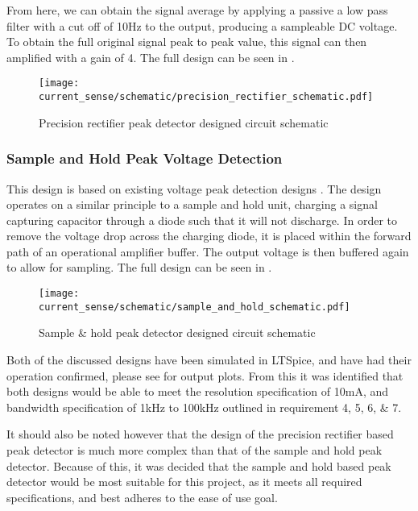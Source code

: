 From here, we can obtain the signal average by applying a passive a low pass filter with a cut off of 10Hz to the output, producing a sampleable DC voltage. To obtain the full original signal peak to peak value, this signal can then amplified with a gain of 4. The full design can be seen in .

\begin{figure}[!h]
    \centering
    \texttt{[image: current\_sense/schematic/precision\_rectifier\_schematic.pdf]}
    \caption{Precision rectifier peak detector designed circuit schematic}
    \label{F:precision_rectifier_circuit}
\end{figure}


\subsubsection*{Sample and Hold Peak Voltage Detection}\label{S:current_sense_sample_and_hold_design}

This design is based on existing voltage peak detection designs \cite{peak_detector_designs,LTC6244_peak_detector}. The design operates on a similar principle to a sample and hold unit, charging a signal capturing capacitor through a diode such that it will not discharge. In order to remove the voltage drop across the charging diode, it is placed within the forward path of an operational amplifier buffer. The output voltage is then buffered again to allow for sampling. The full design can be seen in .

\begin{figure}[!h]
    \centering
    \texttt{[image: current\_sense/schematic/sample\_and\_hold\_schematic.pdf]}
    \caption{Sample \& hold peak detector designed circuit schematic}
    \label{F:sample_and_hold_circuit}
\end{figure}

Both of the discussed designs have been simulated in LTSpice, and have had their operation confirmed, please see  for output plots. From this it was identified that both designs would be able to meet the resolution specification of 10mA, and bandwidth specification of 1kHz to 100kHz outlined in requirement 4, 5, 6, \& 7.

It should also be noted however that the design of the precision rectifier based peak detector is much more complex than that of the sample and hold peak detector. Because of this, it was decided that the sample and hold based peak detector would be most suitable for this project, as it meets all required specifications, and best adheres to the ease of use goal.


